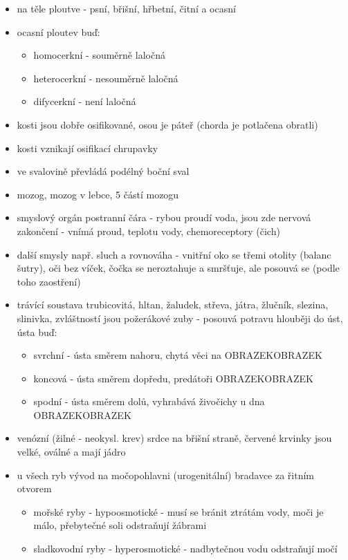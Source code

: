 \documentclass{article}
\begin{document}
\begin{itemize}
  \item na těle ploutve - psní, břišní, hřbetní, čitní a ocasní
  \item ocasní ploutev buď:
  \begin{itemize}
    \item homocerkní - souměrně laločná
    \item heterocerkní - nesouměrně laločná
    \item difycerkní - není laločná
  \end{itemize}
  \item kosti jsou dobře osifikované, osou je páteř (chorda je potlačena obratli)
  \item kosti vznikají osifikací chrupavky
  \item ve svalovině převládá podélný boční sval
  \item mozog, mozog v lebce, 5 částí mozogu
  \item smyslový orgán postranní čára - rybou proudí voda, jsou zde nervová zakončení - vnímá proud, teplotu vody, chemoreceptory (čich)
  \item další smysly např. sluch a rovnováha - vnitřní oko se třemi otolity (balanc šutry), oči bez víček, čočka se neroztahuje a smršťuje, ale posouvá se (podle toho zaostření)
  \item trávící soustava trubicovitá, hltan, žaludek, střeva, játra, žlučník, slezina, slinivka, zvláštností jsou požerákové zuby - posouvá potravu hlouběji do úst, ústa buď:
  \begin{itemize}
    \item svrchní - ústa směrem nahoru, chytá věci na  OBRAZEKOBRAZEK
    \item koncová - ústa směrem dopředu, predátoři OBRAZEKOBRAZEK
    \item spodní - ústa směrem dolů, vyhrabává živočichy u dna OBRAZEKOBRAZEK
  \end{itemize}
  \item venózní (žilné - neokysl. krev) srdce na břišní straně, červené krvinky jsou velké, oválné a mají jádro
  \item u všech ryb vývod na močopohlavni (urogenitální) bradavce za řitním otvorem
  \begin{itemize}
    \item mořské ryby - hypoosmotické - musí se bránit ztrátám vody, moči je málo, přebytečné soli odstraňují žábrami
    \item sladkovodní ryby - hyperosmotické - nadbytečnou vodu odstraňují močí

\end{itemize}
\end{itemize}
\end{document}
